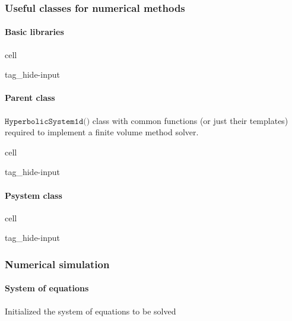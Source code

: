 \documentclass[letterpaper,10pt,english]{jupyterBook}
\begin{document}
\subsubsection{Useful classes for numerical methods}
\label{\detokenize{ch/pde/psys-1d:useful-classes-for-numerical-methods}}

\paragraph{Basic libraries}
\label{\detokenize{ch/pde/psys-1d:basic-libraries}}
\begin{sphinxuseclass}{cell}
\begin{sphinxuseclass}{tag_hide-input}
\end{sphinxuseclass}
\end{sphinxuseclass}

\paragraph{Parent class}
\label{\detokenize{ch/pde/psys-1d:parent-class}}
\sphinxAtStartPar
\(\texttt{HyperbolicSystem1d()}\) class with common functions (or just their templates) required to implement a finite volume method solver.

\begin{sphinxuseclass}{cell}
\begin{sphinxuseclass}{tag_hide-input}
\end{sphinxuseclass}
\end{sphinxuseclass}

\paragraph{P\sphinxhyphen{}system class}
\label{\detokenize{ch/pde/psys-1d:p-system-class}}
\begin{sphinxuseclass}{cell}
\begin{sphinxuseclass}{tag_hide-input}
\end{sphinxuseclass}
\end{sphinxuseclass}

\subsubsection{Numerical simulation}
\label{\detokenize{ch/pde/psys-1d:numerical-simulation}}

\paragraph{System of equations}
\label{\detokenize{ch/pde/psys-1d:system-of-equations}}
\sphinxAtStartPar
Initialized the system of equations to be solved
\end{document}
